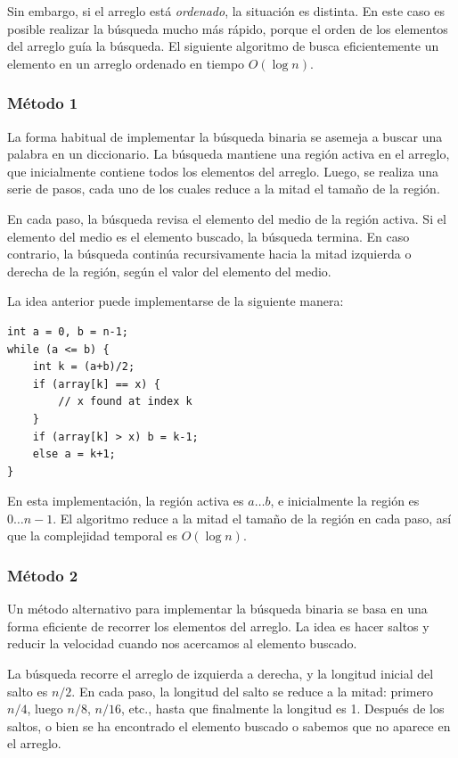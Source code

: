 Sin embargo, si el arreglo está \emph{ordenado},
la situación es distinta.
En este caso es posible realizar la
búsqueda mucho más rápido, porque el orden de los
elementos del arreglo guía la búsqueda.
El siguiente algoritmo de 
busca eficientemente un elemento en un arreglo ordenado
en tiempo $O(\log n)$.

\subsubsection{Método 1}

La forma habitual de implementar la búsqueda binaria
se asemeja a buscar una palabra en un diccionario.
La búsqueda mantiene una región activa en el arreglo,
que inicialmente contiene todos los elementos del arreglo.
Luego, se realiza una serie de pasos,
cada uno de los cuales reduce a la mitad el tamaño de la región.

En cada paso, la búsqueda revisa el elemento del medio
de la región activa.
Si el elemento del medio es el elemento buscado,
la búsqueda termina.
En caso contrario, la búsqueda continúa recursivamente
hacia la mitad izquierda o derecha de la región,
según el valor del elemento del medio.

La idea anterior puede implementarse de la siguiente manera:
\begin{lstlisting}
int a = 0, b = n-1;
while (a <= b) {
    int k = (a+b)/2;
    if (array[k] == x) {
        // x found at index k
    }
    if (array[k] > x) b = k-1;
    else a = k+1;
}
\end{lstlisting}

En esta implementación, la región activa es $a \ldots b$,
e inicialmente la región es $0 \ldots n-1$.
El algoritmo reduce a la mitad el tamaño de la región en cada paso,
así que la complejidad temporal es $O(\log n)$.

\subsubsection{Método 2}

Un método alternativo para implementar la búsqueda binaria
se basa en una forma eficiente de recorrer
los elementos del arreglo.
La idea es hacer saltos y reducir la velocidad
cuando nos acercamos al elemento buscado.

La búsqueda recorre el arreglo de izquierda a
derecha, y la longitud inicial del salto es $n/2$.
En cada paso, la longitud del salto se reduce a la mitad:
primero $n/4$, luego $n/8$, $n/16$, etc., hasta que
finalmente la longitud es 1.
Después de los saltos, o bien se ha encontrado el elemento
buscado o sabemos que no aparece en el arreglo.

